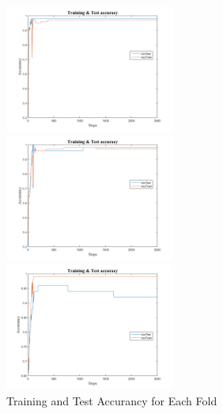 \documentclass[epsfig]{article}
\begin{document}
\begin{figure}[H]
	\caption{Training and Test Accurancy for Each Fold}
	\begin{minipage}[t]{0.3\linewidth}
		\centering
		\includegraphics[width=2.2in]{Acc_1.png}


	\end{minipage}%
	\begin{minipage}[t]{0.3\linewidth}
		\centering
		\includegraphics[width=2.2in]{Acc_2.png}


	\end{minipage}
	\begin{minipage}[t]{0.3\linewidth}
	\centering
	\includegraphics[width=2.2in]{Acc_3.png}


\end{minipage}
\end{figure}
\end{document}
